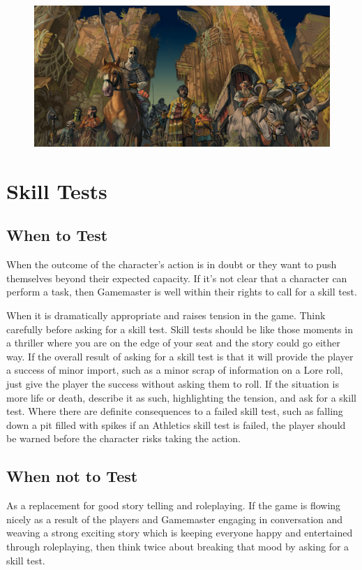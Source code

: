 \begin{figure}
\begin{center}
\includegraphics[scale=0.5]{img/settlers_of_the_fallen_city_by_ncorva.jpg}
\end{center}
\end{figure}



\section{Skill Tests}

\subsection{When to Test}
When the outcome of the character’s action is in doubt or they want to push themselves beyond their expected capacity. If it’s not clear that a character can perform a task, then Gamemaster is well within their rights to call for a skill test.

When it is dramatically appropriate and raises tension in the game. Think carefully before asking for a skill test. Skill tests should be like those moments in a thriller where you are on the edge of your seat and the story could go either way. If the overall result of asking for a skill test is that it will provide the player a success of minor import, such as a minor scrap of information on a Lore roll, just give the player the success without asking them to roll. If the situation is more life or death, describe it as such, highlighting the tension, and ask for a skill test. Where there are definite consequences to a failed skill test, such as falling down a pit filled with spikes if an Athletics skill test is failed, the player should be warned before the character risks taking the action.

\subsection{When not to Test}
As a replacement for good story telling and roleplaying. If the game is flowing nicely as a result of the players and Gamemaster engaging in conversation and weaving a strong exciting story which is keeping everyone happy and entertained through roleplaying, then think twice about breaking that mood by asking for a skill test.

